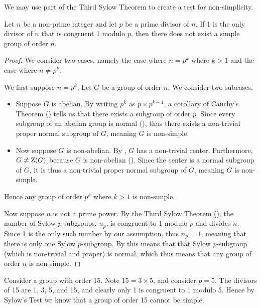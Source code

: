 We may use part of the Third Sylow Theorem to create a test for non-simplicity.

\begin{theorem}
    Let $n$ be a non-prime integer and let $p$ be a prime divisor of $n$. If 1 is the only divisor of $n$ that is congruent 1 modulo $p$, then there does not exist a simple group of order $n$.
\end{theorem}
\begin{proof}
    We consider two cases, namely the case where $n=p^k$ where $k>1$ and the case where $n \neq p^k$.

    We first suppose $n = p^k$. Let $G$ be a group of order $n$. We consider two subcases.
    \begin{itemize}
        \item Suppose $G$ is abelian. By writing $p^k$ as $p \times p^{k-1}$, a corollary of Cauchy's Theorem () tells us that there exists a subgroup of order $p$. Since every subgroup of an abelian group is normal (), thus there exists a non-trivial proper normal subgroup of $G$, meaning $G$ is non-simple.
        \item Now suppose $G$ is non-abelian. By , $G$ has a non-trivial center. Furthermore, $G \neq \mathrm{Z}(G)$ because $G$ is non-abelian (). Since the center is a normal subgroup of $G$, it is thus a non-trivial proper normal subgroup of $G$, meaning $G$ is non-simple.
    \end{itemize}
    Hence any group of order $p^k$ where $k > 1$ is non-simple.

    Now suppose $n$ is not a prime power. By the Third Sylow Theorem (), the number of Sylow $p$-subgroups, $n_p$, is congruent to 1 modulo $p$ and divides $n$. Since 1 is the only such number by our assumption, thus $n_p = 1$, meaning that there is only one Sylow $p$-subgroup. By  this means that that Sylow $p$-subgroup (which is non-trivial and proper) is normal, which thus means that any group of order $n$ is non-simple.
\end{proof}
\begin{example}
    Consider a group with order 15. Note $15 = 3 \times 5$, and consider $p = 5$. The divisors of 15 are 1, 3, 5, and 15, and clearly only 1 is congruent to 1 modulo 5. Hence by Sylow's Test we know that a group of order 15 cannot be simple.
\end{example}

